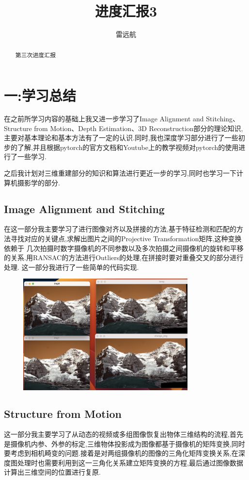 \documentclass{article}
\title{进度汇报3}
\author{雷远航}
\begin{document}
\maketitle

\begin{abstract}
第三次进度汇报

\end{abstract}

\section*{一:学习总结}
在之前所学习内容的基础上我又进一步学习了Image Alignment and Stitching、Structure from Motion、Depth Estimation、3D Reconstruction部分的理论知识,
主要对基本理论和基本方法有了一定的认识.同时,我也深度学习部分进行了一些初步的了解,并且根据pytorch的官方文档和Youtube上的教学视频对pytorch的使用进行了一些学习.

之后我计划对三维重建部分的知识和算法进行更近一步的学习,同时也学习一下计算机摄影学的部分.

\subsection*{Image Alignment and Stitching}
在这一部分我主要学习了进行图像对齐以及拼接的方法,基于特征检测和匹配的方法寻找对应的关键点,求解出图片之间的Projective Transformation矩阵,这种变换依赖于
几次拍摄时数字摄像机的不同参数以及多次拍摄之间摄像机的旋转和平移的关系.用RANSAC的方法进行Outliers的处理,在拼接时要对重叠交叉的部分进行处理.
这一部分我进行了一些简单的代码实现.
\begin{figure}[H]
    \centering
    \includegraphics[width=0.8\textwidth]{2.png}
    \end{figure}



\subsection*{Structure from Motion}
这一部分我主要学习了从动态的视频或多组图像恢复出物体三维结构的流程,首先是摄像机内参、外参的标定,三维物体投影成为图像都基于摄像机的矩阵变换,同时
要考虑到相机畸变的问题.接着是对两组摄像机的图像的三角化矩阵变换关系,在深度图处理时也需要利用到这一三角化关系建立矩阵变换的方程,最后通过图像数据计算出三维空间的位置进行复原.
\end{document}
